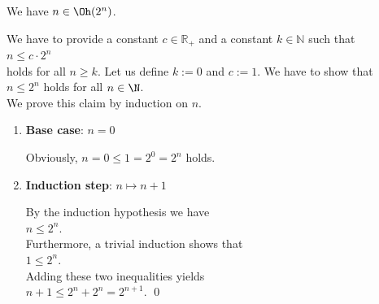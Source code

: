 \example
We have  $n \in \Oh(2^n)$. 
\ex

\proof
We have to provide a constant $c \in \mathbb{R}_+$ and a constant $k\in\mathbb{N}$ such that 
\\[0.2cm]
\hspace*{1.3cm}
$ n \leq c \cdot 2^n$ 
\\[0.2cm]
holds for all $n \geq k$.  Let us define $k := 0$ and $c := 1$.  We have to show that \\[0.2cm]
\hspace*{1.3cm} $n \leq 2^n$ \quad holds for all $n \in \N$.
\\[0.2cm]
We prove this claim by induction on $n$.
\begin{enumerate}
\item \textbf{Base case}: $n = 0$

      Obviously, $n = 0 \leq 1 = 2^0 = 2^n$ holds.  
\item \textbf{Induction step}: $n \mapsto n + 1$

      By the induction hypothesis we have 
      \\[0.2cm]
      \hspace*{1.3cm}
      $n \leq 2^n$.    
      \\[0.2cm]
      Furthermore, a trivial induction shows that
      \\[0.2cm]
      \hspace*{1.3cm}
      $1 \leq 2^n$.
      \\[0.2cm]
      Adding these two inequalities yields
      \\[0.2cm]
      \hspace*{1.3cm} $n+1 \leq 2^n + 2^n = 2^{n+1}$. \qed
\end{enumerate}
\pagebreak 


